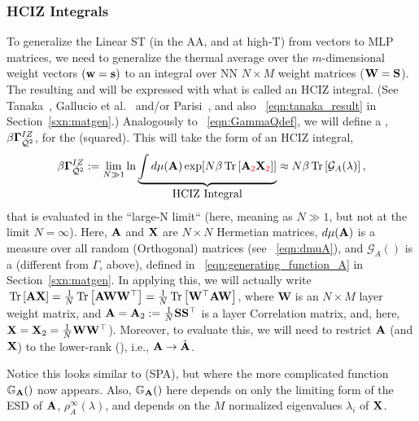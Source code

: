 {\subsubsection{HCIZ Integrals}
\label{sxn:mathP_hciz}

To generalize the Linear ST \Perceptron (in the AA, and at high-T) from \Perceptron vectors to MLP matrices,
we need to generalize the thermal average over the $m$-dimensional \Perceptron weight vectors $({\mathbf{w}}={\mathbf{s}})$
to an integral over NN \Student $N \times M$ weight matrices (${\mathbf{W}}=\mathbf{S}$).
The resulting \PartitionFunction and \FreeEnergy will be expressed with what is called an HCIZ integral.
(See Tanaka~\cite{Tanaka2007, Tanaka2008}, Gallucio et al.~\cite{Bouchaud1998} and/or Parisi~\cite{PP95}, and also \EQN~\ref{eqn:tanaka_result} in Section~\ref{sxn:matgen}.)
Analogously to \EQN~\ref{eqn:GammaQdef}, we will define a \emph{\LayerQuality \GeneratingFunction}, $\beta\mathbf{\Gamma}^{IZ}_{\bar{\mathcal{Q}}^{2}}$, for the \LayerQuality (squared).
This will take the form of an HCIZ integral,
\begin{align}
\label{eqn:hciz_prelim}
\beta\mathbf{\Gamma}^{IZ}_{\bar{\mathcal{Q}}^{2}} := \lim_{N\gg 1}\ln \underbrace{\int d\mu(\mathbf{A}) \exp[N\beta\mbox{}\operatorname{Tr}\left[\mathbf{A}_{{\color{red}\sf{2}}}\mathbf{X}_{{\color{red}\sf{2}}}\right]] }_{\mbox{HCIZ Integral}} 
  \approx N\beta\mbox{}\operatorname{Tr}\left[\mathcal{G}_{A}(\lambda)\right]  ,
\end{align}
that is evaluated in the ``large-N limit`` (here, meaning as $N \gg 1$, but not at the limit $N=\infty$).
Here,  $\mathbf{A}$ and $\mathbf{X}$ are  $N \times N$ Hermetian matrices, $d\mu(\mathbf{A})$ is a measure
over all random (Orthogonal) matrices (see \EQN~\ref{eqn:dmuA}),
and $\mathcal{G}_{A}()$ is a  \GeneratingFunction
(different from $\Gamma$, above), defined in \EQN~\ref{eqn:generating_function_A} in Section~\ref{sxn:matgen}. 
In applying this, we will actually write $\mbox{}\operatorname{Tr}\left[\mathbf{A}\mathbf{X}\right]=\tfrac{1}{N}\mbox{}\operatorname{Tr}\left[\mathbf{A}{\mathbf{W}}{\mathbf{W}}^{\top}\right]=\tfrac{1}{N}\mbox{}\operatorname{Tr}\left[{\mathbf{W}}^{\top}\mathbf{A}{\mathbf{W}}\right]$,
where $\mathbf{W}$ is an $N \times M$ layer weight matrix, and $\mathbf{A}=\mathbf{A}_{2}:=\tfrac{1}{N}{\mathbf{S}}{\mathbf{S}}^{\top}$ is a layer
Correlation matrix, and, here,  $\mathbf{X}=\mathbf{X}_2=\tfrac{1}{N}{\mathbf{W}}{\mathbf{W}}^{\top}$).
Moreover, to evaluate this, we will need to restrict $\mathbf{A}$ (and $\mathbf{X}$)
to the lower-rank \EffectiveCorrelationSpace (\ECS),  i.e., $\mathbf{A}\rightarrow\tilde{\mathbf{A}}$.

Notice this looks similar to \SaddlePointApproximation (SPA), but where the more complicated function
$\mathbb{G}_{\mathbf{A}}()$ now appears.
Also, $\mathbb{G}_{\mathbf{A}}()$ here depends on only the limiting form of the ESD of $\mathbf{A}$, $\rho^{\infty}_{A}(\lambda)$,
and depends on the $M$ normalized eigenvalues $\lambda_{i}$ of $\mathbf{X}$.

}
